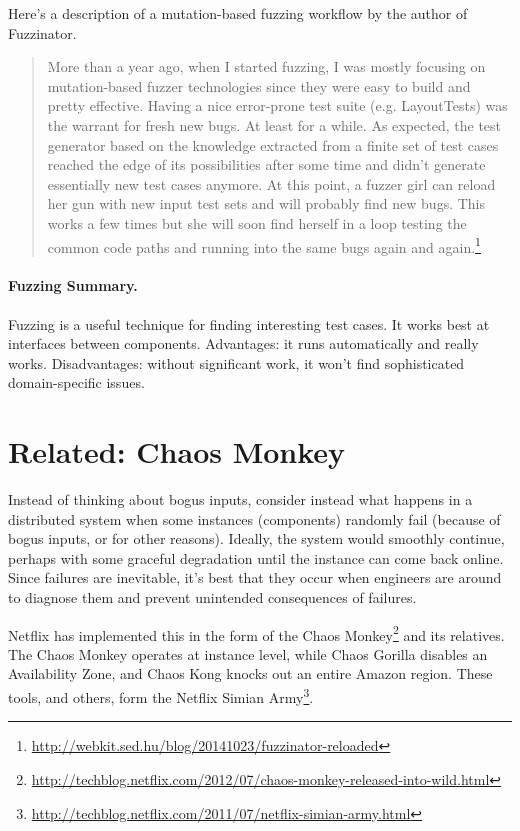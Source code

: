 \documentclass[11pt]{article}
\begin{document}
Here's a description of a mutation-based fuzzing workflow by the author of Fuzzinator.
{\small
\begin{quote}
  More than a year ago, when I started fuzzing, I was mostly focusing on mutation-based fuzzer technologies since they were easy to build and pretty effective. Having a nice error-prone test suite (e.g. LayoutTests) was the warrant for fresh new bugs. At least for a while. As expected, the test generator based on the knowledge extracted from a finite set of test cases reached the edge of its possibilities after some time and didn't generate essentially new test cases anymore. At this point, a fuzzer girl can reload her gun with new input test sets and will probably find new bugs. This works a few times but she will soon find herself in a loop testing the common code paths and running into the same bugs again and again.\footnote{\url{http://webkit.sed.hu/blog/20141023/fuzzinator-reloaded}}
\end{quote}
}
\paragraph{Fuzzing Summary.} Fuzzing is a useful technique for finding
interesting test cases. It works best at interfaces between components.
Advantages: it runs automatically and really works. Disadvantages: without
significant work, it won't find sophisticated domain-specific issues.

\section*{Related: Chaos Monkey}
Instead of thinking about bogus inputs, consider instead what happens
in a distributed system when some instances (components) randomly fail
(because of bogus inputs, or for other reasons). Ideally, the system
would smoothly continue, perhaps with some graceful degradation until
the instance can come back online. Since failures are inevitable, it's
best that they occur when engineers are around to diagnose them and
prevent unintended consequences of failures.

Netflix has implemented this in the form of the Chaos
Monkey\footnote{\url{http://techblog.netflix.com/2012/07/chaos-monkey-released-into-wild.html}}
and its relatives. The Chaos Monkey operates at instance level, while
Chaos Gorilla disables an Availability Zone, and Chaos Kong knocks out
an entire Amazon region. These tools, and others, form the Netflix
Simian
Army\footnote{\url{http://techblog.netflix.com/2011/07/netflix-simian-army.html}}.
\end{document}
